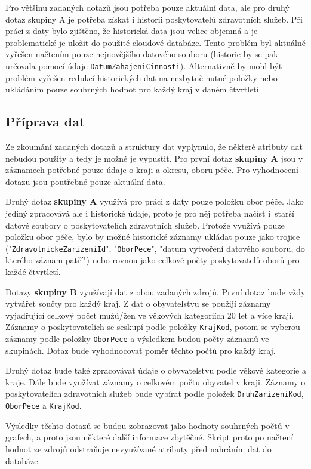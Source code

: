 \documentclass[11pt, a4paper]{article}
\theoremstyle{definition}
\theoremstyle{plain}
\begin{document}
Pro většinu zadaných dotazů jsou potřeba pouze aktuální data, ale pro druhý dotaz skupiny A je potřeba získat i historii poskytovatelů zdravotních služeb. Při práci z daty bylo zjištěno, že historická data jsou velice objemná a je problematické je uložit do použité cloudové databáze. Tento problém byl aktuálně vyřešen načtením pouze nejnovějšího datového souboru (historie by se pak určovala pomocí údaje \texttt{DatumZahajeniCinnosti}). Alternativně by mohl být problém vyřešen redukcí historických dat na nezbytně nutné položky nebo ukládáním pouze souhrných hodnot pro každý kraj v daném čtvrtletí.

\subsection{Příprava dat}
Ze zkoumání zadaných dotazů a struktury dat vyplynulo, že některé atributy dat nebudou použity a tedy je možné je vypustit. Pro první dotaz \textbf{skupiny A} jsou v záznamech potřebné pouze údaje o kraji a okresu, oboru péče. Pro vyhodnocení dotazu jsou poutřebné pouze aktuální data.

Druhý dotaz \textbf{skupiny A} využívá pro práci z daty pouze položku obor péče. Jako jediný zpracovává ale i historické údaje, proto je pro něj potřeba načíst i~starší datové soubory o poskytovatelích zdravotních služeb. Protože využívá pouze položku obor péče, bylo by možné historické záznamy ukládat pouze jako trojice ("\texttt{ZdravotnickeZarizeniId}", "\texttt{OborPece}", "datum vytvoření datového souboru, do kterého záznam patří") nebo rovnou jako celkové počty poskytovatelů oborů pro každé čtvrtletí.

Dotazy \textbf{skupiny B} využívají dat z obou zadaných zdrojů. První dotaz bude vždy vytvářet součty pro každý kraj. Z dat o obyvatelstvu se použijí záznamy vyjadřující celkový počet mužů/žen ve věkových kategoriích 20 let a více kraji. Záznamy o poskytovatelích se seskupí podle položky \texttt{KrajKod}, potom se vyberou záznamy podle položky \texttt{OborPece} a výsledkem budou počty záznamů ve skupinách. Dotaz bude vyhodnocovat poměr těchto počtů pro každý kraj.

Druhý dotaz bude také zpracovávat údaje o obyvatelstvu podle věkové kategorie a kraje. Dále bude využívat záznamy o celkovém počtu obyvatel v kraji. Záznamy o poskytovatelích zdravotních služeb bude vybírat podle položek \texttt{DruhZarizeniKod}, \texttt{OborPece} a \texttt{KrajKod}.

Výsledky těchto dotazů se budou zobrazovat jako hodnoty souhrných počtů v grafech, a proto jsou některé další informace zbytěčné. Skript proto po načtení hodnot ze zdrojů odstraňuje nevyužívané atributy před nahráním dat do databáze.
\end{document}
